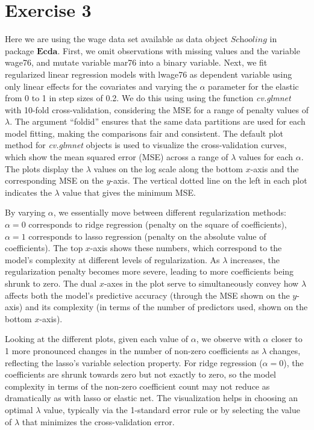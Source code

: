 \documentclass[
]{article}
\begin{document}
\hypertarget{exercise-3}{%
\section{Exercise 3}\label{exercise-3}}

Here we are using the wage data set available as data object
\(\textit{Schooling}\) in package \(\textbf{Ecda}\). First, we omit
observations with missing values and the variable wage76, and mutate
variable mar76 into a binary variable. Next, we fit regularized linear
regression models with lwage76 as dependent variable using only linear
effects for the covariates and varying the \(\alpha\) parameter for the
elastic from 0 to 1 in step sizes of 0.2. We do this using using the
function \textit{cv.glmnet} with 10-fold cross-validation, considering
the MSE for a range of penalty values of \(\lambda\). The argument
``foldid'' ensures that the same data partitions are used for each model
fitting, making the comparisons fair and consistent. The default plot
method for \textit{cv.glmnet} objects is used to visualize the
cross-validation curves, which show the mean squared error (MSE) across
a range of \(\lambda\) values for each \(\alpha\). The plots display the
\(\lambda\) values on the log scale along the bottom \(x\)-axis and the
corresponding MSE on the \(y\)-axis. The vertical dotted line on the
left in each plot indicates the \(\lambda\) value that gives the minimum
MSE.

By varying \(\alpha\), we essentially move between different
regularization methods: \(\alpha = 0\) corresponds to ridge regression
(penalty on the square of coefficients), \(\alpha = 1\) corresponds to
lasso regression (penalty on the absolute value of coefficients). The
top \(x\)-axis shows these numbers, which correspond to the model's
complexity at different levels of regularization. As \(\lambda\)
increases, the regularization penalty becomes more severe, leading to
more coefficients being shrunk to zero. The dual \(x\)-axes in the plot
serve to simultaneously convey how \(\lambda\) affects both the model's
predictive accuracy (through the MSE shown on the \(y\)-axis) and its
complexity (in terms of the number of predictors used, shown on the
bottom \(x\)-axis).

Looking at the different plots, given each value of \(\alpha\), we
observe with \(\alpha\) closer to 1 more pronounced changes in the
number of non-zero coefficients as \(\lambda\) changes, reflecting the
lasso's variable selection property. For ridge regression
(\(\alpha = 0\)), the coefficients are shrunk towards zero but not
exactly to zero, so the model complexity in terms of the non-zero
coefficient count may not reduce as dramatically as with lasso or
elastic net. The visualization helps in choosing an optimal \(\lambda\)
value, typically via the 1-standard error rule or by selecting the value
of \(\lambda\) that minimizes the cross-validation error.
\end{document}
